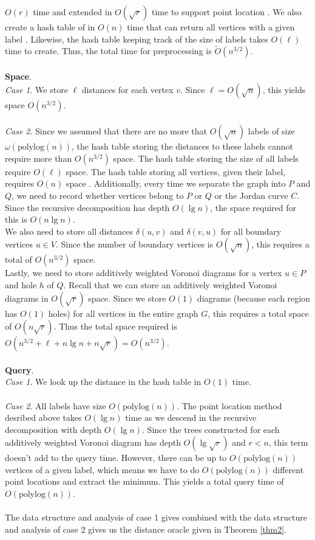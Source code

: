 $O(r)$ time and extended in $O(\sqrt{r})$ time to support point location
\cite{gawrychowski2017better}. We also create a hash table of
in $O(n)$ time that can return all vertices with a given label \cite{fredman1984storing}.
Likewise, the hash table keeping track of the size of labels takes $O(\ell)$ time to
create. Thus, the total time for preprocessing is $\tilde{O}(n^{3/2})$. \\
\\
\textbf{Space}. \\
\textit{Case 1}. We store $\ell$ distances for each vertex $v$. Since $\ell=O(\sqrt{n})$, this
yields space $O(n^{3/2})$. \\
\\
\textit{Case 2}. Since we assumed that there are no more that
$O(\sqrt{n})$ labels of size $\omega(\text{polylog}(n))$, the hash table storing the
distances to these labels cannot require more than $O(n^{3/2})$ space. The hash table
storing the size of all labels require $O(\ell)$ space. The hash table storing all
vertices, given their label, requires $O(n)$ space \cite{fredman1984storing}. Additionally, every time we
separate the graph into $P$ and $Q$, we need to record whether vertices belong to $P$ or
$Q$ or the Jordan curve $C$. Since the recursive decomposition has depth $O(\lg n)$, the
space required for this is $O(n\lg n)$. \\
We also need to store all distances $\delta(u,v)$ and $\delta(v,u)$ for all
boundary vertices $u\in V$. Since the number of boundary vertices is $O(\sqrt{n})$, this
requires a total of $O(n^{3/2})$ space. \\
Lastly, we need to store additively weighted Voronoi diagrams for a vertex $u\in P$ and
hole $h$ of $Q$. Recall that we can store an additively weighted Voronoi diagrams in
$O(\sqrt{r})$ space. Since we store $O(1)$ diagrams (because each region has $O(1)$ holes) for
all vertices in the entire graph $G$, this requires a total space of $O(n\sqrt{r})$.
Thus the total space required is $O(n^{3/2}+\ell+n\lg n+n\sqrt{r})=O(n^{3/2})$. \\
\\
\textbf{Query}. \\
\textit{Case 1}. We look up the distance in the hash table in $O(1)$ time.\\
\\
\textit{Case 2}. All labels have size $O(\text{polylog}(n))$. The point location method desribed
above takes $O(\lg n)$ time as we descend in the recursive decomposition with depth
$O(\lg n)$. Since the trees constructed for each additively weighted Voronoi diagram has
depth $O(\lg \sqrt{r})$ and $r<n$, this term doesn't add to the query time. However,
there can be up to $O(\text{polylog}(n))$ vertices of a given label, which means we have
to do $O(\text{polylog}(n))$ different point locations and extract the minimum. This
yields a total query time of $O(\text{polylog}(n))$. \\
\\
The data structure and analysis of case 1 gives combined with the data structure and analysis of case 2 gives us the distance oracle given in Theorem \ref{thm2}.

